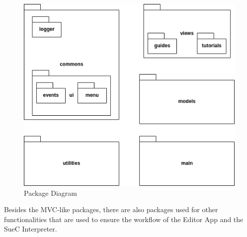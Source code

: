 \documentclass[12pt,a4paper,twoside]{report}
\begin{document}
\begin{figure}[h]
 \centering
 \includegraphics[scale=0.5]{img/packagediag.png}
 \caption{Package Diagram}
\end{figure}

Besides the MVC-like packages, there are also packages used for other functionalities that are used to ensure the workflow of the Editor App and the SueC Interpreter.
\end{document}
